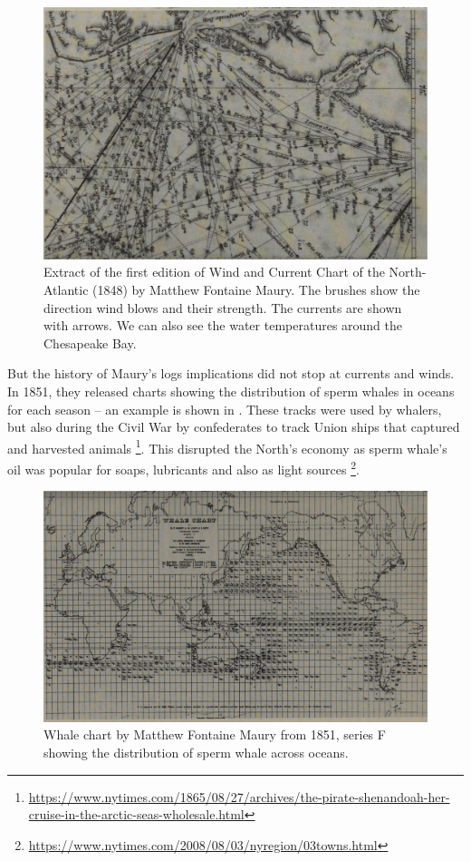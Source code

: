 \begin{figure}[ht]
    \centering
    \includegraphics[width=.7\textwidth]{chapters/images/windmaps.pdf}
    \caption{Extract of the first edition of Wind and Current Chart of the North-Atlantic (1848) by Matthew Fontaine Maury. The brushes show the direction wind blows and their strength. The currents are shown with arrows. We can also see the water temperatures around the Chesapeake Bay.} 
    \label{fig:wind-current}
\end{figure}

But the history of Maury's logs implications did not stop at currents and winds. In 1851, they released charts showing the distribution of sperm whales in oceans for each season -- an example is shown in . These tracks were used by whalers, but also during the Civil War by confederates to track Union ships that captured and harvested animals \footnote{\url{https://www.nytimes.com/1865/08/27/archives/the-pirate-shenandoah-her-cruise-in-the-arctic-seas-wholesale.html}}. This disrupted the North's economy as sperm whale's oil was popular for soaps, lubricants and also as light sources \footnote{\url{https://www.nytimes.com/2008/08/03/nyregion/03towns.html}}.
\begin{figure}[ht]
    \centering
    \includegraphics[width=.7\textwidth]{chapters/images/whales.pdf}
    \caption{Whale chart by Matthew Fontaine Maury from 1851, series F showing the distribution of sperm whale across oceans.} 
    \label{fig:whale-chart}
\end{figure}

